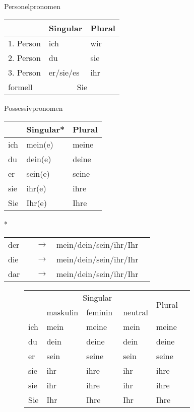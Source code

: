 \begin{syntax}{Personelpronomen}{}
\begin{tabular}{|l|l|l|}
	\hline
	& Singular & Plural \\
	\hline
	1. Person & ich & wir \\
	2. Person & du & sie \\
	3. Person & er/sie/es & ihr \\
	\hline
	formell & \multicolumn{2}{c|}{Sie} \\
	\hline
\end{tabular}
\end{syntax}

\begin{syntax}{Possessivpronomen}{}
\begin{tabular}{|l|l|l|}
	\hline
	& Singular* & Plural \\
	\hline
	ich & mein(e) & meine \\
	du & dein(e) & deine \\
	\hline
	er & sein(e) & seine \\
	sie & ihr(e) & ihre \\
	\hline
	Sie & Ihr(e) & Ihre \\
	\hline
\end{tabular}

*
\begin{mdframed}
	\begin{tabular}{lllll}
		der & \ssthere & $\rightarrow$ & mein/dein/sein/ihr/Ihr & \ssthere \\
		die & \ssthere & $\rightarrow$ & mein\att{e}/dein\att{e}/sein\att{e}/ihr\att{e}/Ihr\att{e} & \ssthere \\
		dar & \ssthere & $\rightarrow$ & mein/dein/sein/ihr/Ihr & \ssthere
	\end{tabular}
\end{mdframed}

\begin{figure}[H]
\begin{tabular}{l|ll|ll|ll|ll}
\hline
	& \multicolumn{6}{c|}{Singular} & \multirow{2}{*}{Plural} & \\
\cline{1-7}
	& \multicolumn{2}{l|}{maskulin} & \multicolumn{2}{l|}{feminin} & \multicolumn{2}{l|}{neutral} & & \\
\hline
	ich & mein & \ssthere & meine & \ssthere & mein & \ssthere & meine & \ssthere \\
\hline
	du & dein & \ssthere & deine & \ssthere & dein & \ssthere & deine & \ssthere \\
\hline
	er & sein & \ssthere & seine & \ssthere & sein & \ssthere & seine & \ssthere \\
	sie & ihr & \ssthere & ihre & \ssthere & ihr & \ssthere & ihre & \ssthere \\
\hline
	sie & ihr & \ssthere & ihre & \ssthere & ihr & \ssthere & ihre & \ssthere \\
\hline
	Sie & Ihr & \ssthere & Ihre & \ssthere & Ihr & \ssthere & Ihre & \ssthere \\
\hline
\end{tabular}
\end{figure}
\end{syntax}

